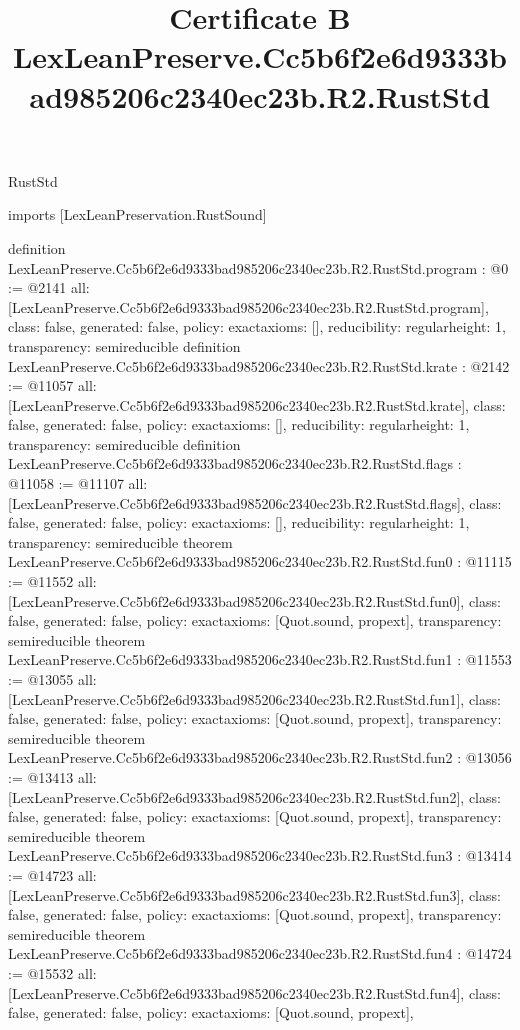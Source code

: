 \begin{lexlean}{RustStd}
\title{Certificate B LexLeanPreserve.Cc5b6f2e6d9333bad985206c2340ec23b.R2.RustStd}
\begin{coremodule}
imports [LexLeanPreservation.RustSound]

definition LexLeanPreserve.Cc5b6f2e6d9333bad985206c2340ec23b.R2.RustStd.program : @0 := @2141 {
  all: [LexLeanPreserve.Cc5b6f2e6d9333bad985206c2340ec23b.R2.RustStd.program],
  class: false,
  generated: false,
  policy: exact{axioms: []},
  reducibility: regular{height: 1},
  transparency: semireducible
}
definition LexLeanPreserve.Cc5b6f2e6d9333bad985206c2340ec23b.R2.RustStd.krate : @2142 := @11057 {
  all: [LexLeanPreserve.Cc5b6f2e6d9333bad985206c2340ec23b.R2.RustStd.krate],
  class: false,
  generated: false,
  policy: exact{axioms: []},
  reducibility: regular{height: 1},
  transparency: semireducible
}
definition LexLeanPreserve.Cc5b6f2e6d9333bad985206c2340ec23b.R2.RustStd.flags : @11058 := @11107 {
  all: [LexLeanPreserve.Cc5b6f2e6d9333bad985206c2340ec23b.R2.RustStd.flags],
  class: false,
  generated: false,
  policy: exact{axioms: []},
  reducibility: regular{height: 1},
  transparency: semireducible
}
theorem LexLeanPreserve.Cc5b6f2e6d9333bad985206c2340ec23b.R2.RustStd.fun0 : @11115 := @11552 {
  all: [LexLeanPreserve.Cc5b6f2e6d9333bad985206c2340ec23b.R2.RustStd.fun0],
  class: false,
  generated: false,
  policy: exact{axioms: [Quot.sound, propext]},
  transparency: semireducible
}
theorem LexLeanPreserve.Cc5b6f2e6d9333bad985206c2340ec23b.R2.RustStd.fun1 : @11553 := @13055 {
  all: [LexLeanPreserve.Cc5b6f2e6d9333bad985206c2340ec23b.R2.RustStd.fun1],
  class: false,
  generated: false,
  policy: exact{axioms: [Quot.sound, propext]},
  transparency: semireducible
}
theorem LexLeanPreserve.Cc5b6f2e6d9333bad985206c2340ec23b.R2.RustStd.fun2 : @13056 := @13413 {
  all: [LexLeanPreserve.Cc5b6f2e6d9333bad985206c2340ec23b.R2.RustStd.fun2],
  class: false,
  generated: false,
  policy: exact{axioms: [Quot.sound, propext]},
  transparency: semireducible
}
theorem LexLeanPreserve.Cc5b6f2e6d9333bad985206c2340ec23b.R2.RustStd.fun3 : @13414 := @14723 {
  all: [LexLeanPreserve.Cc5b6f2e6d9333bad985206c2340ec23b.R2.RustStd.fun3],
  class: false,
  generated: false,
  policy: exact{axioms: [Quot.sound, propext]},
  transparency: semireducible
}
theorem LexLeanPreserve.Cc5b6f2e6d9333bad985206c2340ec23b.R2.RustStd.fun4 : @14724 := @15532 {
  all: [LexLeanPreserve.Cc5b6f2e6d9333bad985206c2340ec23b.R2.RustStd.fun4],
  class: false,
  generated: false,
  policy: exact{axioms: [Quot.sound, propext]},
}
\end{coremodule}
\end{lexlean}
